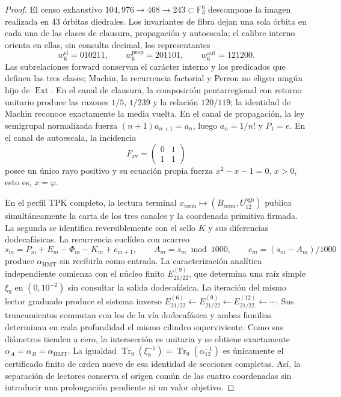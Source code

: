 \begin{proof}
El censo exhaustivo
\(104,976\to468\to243\subset\mathbb F_3^6\) descompone la imagen realizada
en \(43\) órbitas diedrales. Los invariantes de fibra dejan una sola órbita
en cada una de las clases de clausura, propagación y autoescala; el calibre
interno orienta en ellas, sin consulta decimal, los representantes
\[
 w_6^{\mathrm{cl}}=010211,
 \qquad w_6^{\mathrm{prop}}=201101,
 \qquad w_6^{\mathrm{aut}}=121200.
\]
Las subrelaciones forward conservan el carácter interno y los predicados que
definen las tres clases; Machin, la recurrencia factorial y Perron no eligen
ningún hijo de \(\operatorname{Ext}\). En el
canal de clausura, la composición pentarregional con retorno unitario produce
las razones \(1/5\), \(1/239\) y la relación \(120/119\); la identidad de
Machin reconoce exactamente la media vuelta. En el canal de propagación, la
ley semigrupal normalizada fuerza
\((n+1)a_{n+1}=a_n\), luego \(a_n=1/n!\) y \(P_1=e\). En el canal de
autoescala, la incidencia
\[
 F_{\mathrm{av}}=\begin{pmatrix}0&1\\1&1\end{pmatrix}
\]
posee un único rayo positivo y su ecuación propia fuerza
\(x^2-x-1=0\), \(x>0\), esto es, \(x=\varphi\).

En el perfil TPK completo, la lectura terminal
\(x_{\mathrm{term}}\mapsto(B_{\mathrm{term}},U_{12}^{\mathrm{sgn}})\)
publica simultáneamente la carta de los tres canales y la coordenada
primitiva firmada. La
segunda se identifica reversiblemente con el sello \(K\) y sus diferencias
dodecafásicas. La recurrencia euclídea con acarreo
\[
 s_m=P_m+E_m-\Phi_m-K_m+c_{m+1},\qquad
 A_m=s_m\bmod1000,\qquad
 c_m=(s_m-A_m)/1000
\]
produce \(\alpha_{\mathrm{HMT}}\) sin recibirla como entrada. La
caracterización analítica independiente comienza con el núcleo finito
\(E_{21/22}^{(9)}\), que determina una raíz simple \(\xi_9\) en
\((0,10^{-2})\) sin consultar la salida dodecafásica. La iteración del mismo
lector graduado produce el sistema inverso
\(E_{21/22}^{(6)}\leftarrow E_{21/22}^{(9)}\leftarrow
E_{21/22}^{(12)}\leftarrow\cdots\). Sus truncamientos conmutan con los de la
vía dodecafásica y ambas familias determinan en cada profundidad el mismo
cilindro superviviente. Como sus diámetros tienden a cero, la intersección es
unitaria y se obtiene exactamente
\(\alpha_A=\alpha_B=\alpha_{\mathrm{HMT}}\). La igualdad
\(\operatorname{Tr}_9(\xi_9^{-1})=
\operatorname{Tr}_9(\alpha_{12}^{-1})\) es únicamente el certificado finito
de orden nueve de esa identidad de secciones completas. Así, la separación
de lectores conserva el origen común de las cuatro coordenadas sin introducir
una prolongación pendiente ni un valor objetivo.
\end{proof}

